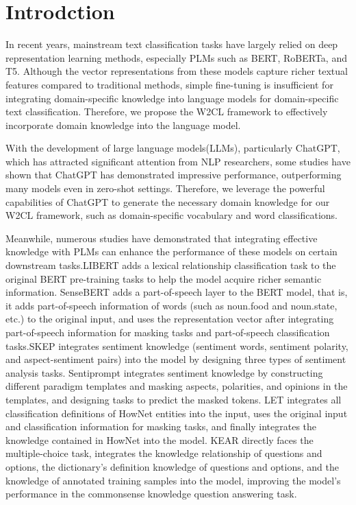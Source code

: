 \section{Introdction}
\label{sec:intro}
In recent years, mainstream text classification tasks have largely relied on deep representation learning methods, especially PLMs such as BERT\cite{bert}, RoBERTa\cite{roberta}, and T5\cite{t5}. Although the vector representations from these models capture richer textual features compared to traditional methods, simple fine-tuning is insufficient for integrating domain-specific knowledge into language models for domain-specific text classification. Therefore, we propose the W2CL framework to effectively incorporate domain knowledge into the language model.

With the development of large language models(LLMs)\cite{bert,lm5,lm1,roberta,lm6,lm2,lm4,lm3}, particularly ChatGPT\cite{gpt}, which has attracted significant attention from NLP researchers, some studies\cite{gptuse2,gptuse1,gptuse5,gptuse4,gptuse3} have shown that ChatGPT has demonstrated impressive performance, outperforming many models even in zero-shot settings. Therefore, we leverage the powerful capabilities of ChatGPT to generate the necessary domain knowledge for our W2CL framework, such as domain-specific vocabulary and word classifications.

Meanwhile, numerous studies have demonstrated that integrating effective knowledge with PLMs can enhance the performance of these models on certain downstream tasks.LIBERT\cite{libert} adds a lexical relationship classification task to the original BERT pre-training tasks to help the model acquire richer semantic information. SenseBERT\cite{sensebert} adds a part-of-speech layer to the BERT model, that is, it adds part-of-speech information of words (such as noun.food and noun.state, etc.) to the original input, and uses the representation vector after integrating part-of-speech information for masking tasks and part-of-speech classification tasks.SKEP\cite{skep} integrates sentiment knowledge (sentiment words, sentiment polarity, and aspect-sentiment pairs) into the model by designing three types of sentiment analysis tasks. Sentiprompt\cite{sentiprompt} integrates sentiment knowledge by constructing different paradigm templates and masking aspects, polarities, and opinions in the templates, and designing tasks to predict the masked tokens. LET\cite{let} integrates all classification definitions of HowNet entities into the input, uses the original input and classification information for masking tasks, and finally integrates the knowledge contained in HowNet into the model. KEAR\cite{kear} directly faces the multiple-choice task, integrates the knowledge relationship of questions and options, the dictionary’s definition knowledge of questions and options, and the knowledge of annotated training samples into the model, improving the model’s performance in the commonsense knowledge question answering task.

